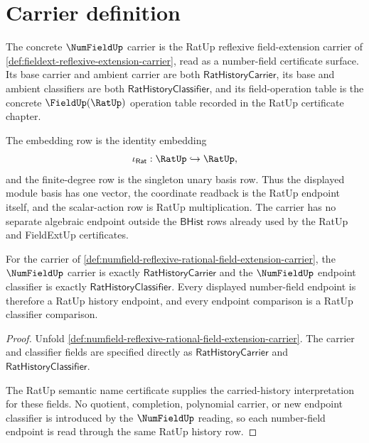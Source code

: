 \section{Carrier definition}
\label{sec:numfield-carrier}

\begin{definition}
\label{def:numfield-reflexive-rational-field-extension-carrier}
\label{def:numfield-rat-reflexive-carrier}
The concrete $\NumFieldUp$ carrier is the RatUp reflexive field-extension
carrier of \autoref{def:fieldext-reflexive-extension-carrier}, read as a
number-field certificate surface. Its base carrier and ambient carrier are
both $\mathsf{RatHistoryCarrier}$, its base and ambient classifiers are both
$\mathsf{RatHistoryClassifier}$, and its field-operation table is the concrete
$\FieldUp(\RatUp)$ operation table recorded in the RatUp certificate chapter.

The embedding row is the identity embedding
$$
\iota_{\mathsf{Rat}}:\RatUp\hookrightarrow\RatUp ,
$$
and the finite-degree row is the singleton unary basis row. Thus the displayed
module basis has one vector, the coordinate readback is the RatUp endpoint
itself, and the scalar-action row is RatUp multiplication. The carrier has no
separate algebraic endpoint outside the $\mathsf{BHist}$ rows already used by
the RatUp and FieldExtUp certificates.
\end{definition}

\begin{theorem}
\label{thm:numfield-reflexive-carrier-classifier}
For the carrier of
\autoref{def:numfield-reflexive-rational-field-extension-carrier}, the
$\NumFieldUp$ carrier is exactly $\mathsf{RatHistoryCarrier}$ and the
$\NumFieldUp$ endpoint classifier is exactly $\mathsf{RatHistoryClassifier}$.
Every displayed number-field endpoint is therefore a RatUp history endpoint,
and every endpoint comparison is a RatUp classifier comparison.
\end{theorem}
\begin{proof}
Unfold \autoref{def:numfield-reflexive-rational-field-extension-carrier}. The
carrier and classifier fields are specified directly as
$\mathsf{RatHistoryCarrier}$ and $\mathsf{RatHistoryClassifier}$.

The RatUp semantic name certificate supplies the carried-history
interpretation for these fields. No quotient, completion, polynomial carrier,
or new endpoint classifier is introduced by the $\NumFieldUp$ reading, so each
number-field endpoint is read through the same RatUp history row.
\end{proof}

